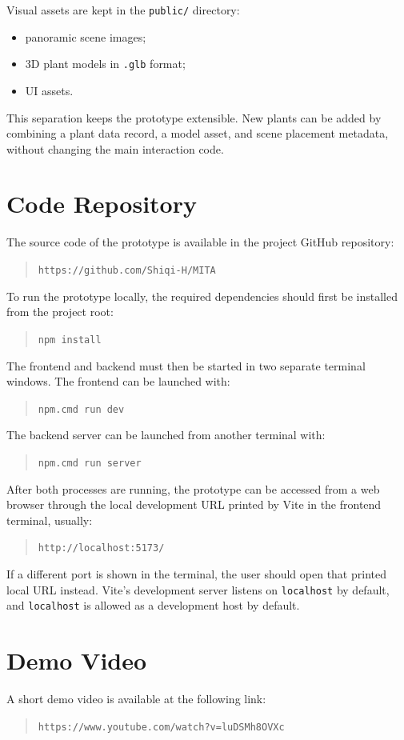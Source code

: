 \documentclass[12pt,a4paper]{article}
\begin{document}
Visual assets are kept in the \texttt{public/} directory:

\begin{itemize}
    \item panoramic scene images;
    \item 3D plant models in \texttt{.glb} format;
    \item UI assets.
\end{itemize}

This separation keeps the prototype extensible. New plants can be added by
combining a plant data record, a model asset, and scene placement metadata,
without changing the main interaction code.

\section{Code Repository}

The source code of the prototype is available in the project GitHub repository:

\begin{quote}
\texttt{https://github.com/Shiqi-H/MITA}
\end{quote}

To run the prototype locally, the required dependencies should first be installed from the project root:

\begin{quote}
\texttt{npm install}
\end{quote}

The frontend and backend must then be started in two separate terminal windows. The frontend can be launched with:

\begin{quote}
\texttt{npm.cmd run dev}
\end{quote}

The backend server can be launched from another terminal with:

\begin{quote}
\texttt{npm.cmd run server}
\end{quote}

After both processes are running, the prototype can be accessed from a web
browser through the local development URL printed by Vite in the frontend
terminal, usually:

\begin{quote}
\texttt{http://localhost:5173/}
\end{quote}

If a different port is shown in the terminal, the user should open that printed
local URL instead. Vite's development server listens on \texttt{localhost} by
default, and \texttt{localhost} is allowed as a development host by default.

\section{Demo Video}

A short demo video is available at the following link:

\begin{quote}
\texttt{https://www.youtube.com/watch?v=luDSMh8OVXc}
\end{quote}
\end{document}
